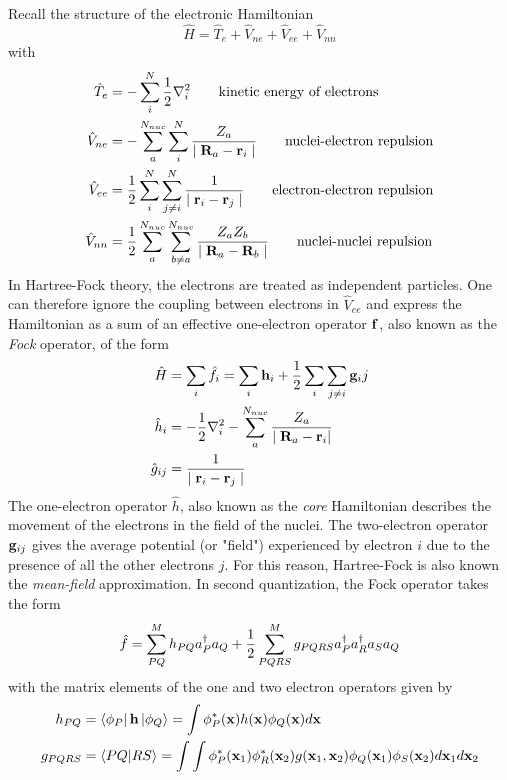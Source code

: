 Recall the structure of the electronic Hamiltonian
\begin{equation}
\hat{H} = \hat{T}_e + \hat{V}_{ne} + \hat{V}_{ee} + \hat{V}_{nn}
\end{equation}
\noindent with
\begin{align}
\hat{T}_e &= -\sum_i^N \frac{1}{2} \nabla_i^2 \qquad \textrm{kinetic energy of electrons} \\
\hat{V}_{ne} &= -\sum_a^{N_{nuc}} \sum_i^N \frac{Z_a}{\mid\mathbf{R}_a - \mathbf{r}_i\mid} \qquad \textrm{nuclei-electron repulsion} \\
\hat{V}_{ee} &= \frac{1}{2} \sum^N_i \sum^N_{j \neq i} \frac{1}{\mid \mathbf{r}_i - \mathbf{r}_j\mid} \qquad \textrm{electron-electron repulsion} \\
\hat{V}_{nn} &= \frac{1}{2}\sum_a^{N_{nuc}} \sum_{b \neq a}^{N_{nuc}} \frac{Z_a Z_b}{\mid \mathbf{R}_a - \mathbf{R}_b \mid} \qquad \textrm{nuclei-nuclei repulsion} 
\end{align}
\noindent In Hartree-Fock theory, the electrons are treated as independent particles. One can therefore ignore the coupling between electrons in $\hat{V}_{ee}$ and express the Hamiltonian as a sum of an effective one-electron operator $\mathbf{f}$, also known as the \emph{Fock} operator, of the form
\begin{align}
\hat{H} &= \sum_i \hat{f}_i =  \sum_i \mathbf{h}_i + \frac{1}{2} \sum_i \sum_{j \neq i} \mathbf{g}_ij  \\
\hat{h}_i &= -\frac{1}{2}\nabla_i^2 - \sum_a^{N_{nuc}} \frac{Z_a}{\mid \mathbf{R}_a - \mathbf{r}_i |} \\
\hat{g}_{ij} &= \frac{1}{\mid \mathbf{r}_i - \mathbf{r}_j \mid}
\end{align}
\noindent The one-electron operator $\hat{h}$, also known as the \emph{core} Hamiltonian describes the movement of the electrons in the field of the nuclei. The two-electron operator $\mathbf{g}_{ij}$ gives the average potential (or "field") experienced by electron $i$ due to the presence of all the other electrons $j$. For this reason, Hartree-Fock is also known the \emph{mean-field} approximation. In second quantization, the Fock operator takes the form
\begin{equation}
\hat{f} = \sum^{M}_{PQ} h_{PQ} a^{\dagger}_P a_Q + \frac{1}{2} \sum^{M}_{PQRS} g_{PQRS} a^{\dagger}_P a^{\dagger}_R a_S a_Q
\label{eq:FOCK2Q}
\end{equation}
\noindent with the matrix elements of the one and two electron operators given by
\begin{align}
h_{PQ} &= \bra{\phi_P} \mathbf{h} \ket{\phi_Q} = \int \phi_P^*(\mathbf{x}) h(\mathbf{x}) \phi_Q(\mathbf{x}) d\mathbf{x} \\
g_{PQRS} &= \bra{PQ}\ket{RS} = \int\int \phi_P^*(\mathbf{x}_1) \phi^*_R(\mathbf{x}_2) g(\mathbf{x}_1,\mathbf{x}_2) \phi_Q(\mathbf{x}_1) \phi_S(\mathbf{x}_2) d\mathbf{x}_1 d\mathbf{x}_2
\end{align} 
